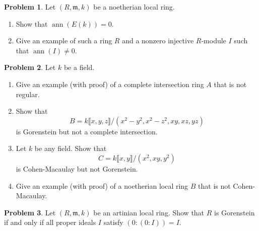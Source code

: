\documentclass[11pt]{article}
\DeclareMathOperator{\ann}{ann}
\newcommand{\m}{\mathfrak{m}}
\theoremstyle{definition}
\newtheorem{problem}{Problem}
\begin{document}
\vfill

\begin{problem}
	Let $(R, \m, k)$ be a noetherian local ring.
	
	\vspace{-0.5em}
	\begin{enumerate}[label=\alph*), itemsep=-0.1em]
		\item Show that $\ann(E(k)) = 0$.
		\item Give an example of such a ring $R$ and a nonzero injective $R$-module $I$ such that $\ann(I) \neq 0$.
	\end{enumerate}
\end{problem}

\vfill

\begin{problem}
	Let $k$ be a field.
	
	\vspace{-0.5em}
	\begin{enumerate}[label=\alph*), itemsep=-0.1em]
		\item Give an example (with proof) of a complete intersection ring $A$ that is not regular.
		\item Show that
	\[ B = k \llbracket x,y,z \rrbracket /(x^2-y^2, x^2-z^2, xy, xz,yz) \]
	is Gorenstein but not a complete intersection.
	\item Let $k$ be any field. Show that
	\[ C = k \llbracket x,y \rrbracket /(x^2, xy, y^2) \]
	is Cohen-Macaulay but not Gorenstein.
	\item Give an example (with proof) of a noetherian local ring $B$ that is not Cohen-Macaulay.
	\end{enumerate}
\end{problem}

\vfill

\begin{problem}
	Let $(R, \m, k)$ be an artinian local ring. Show that $R$ is Gorenstein if and only if all proper ideals $I$ satisfy $(0 : (0 : I)) = I$.
\end{problem}

\newpage
\end{document}
